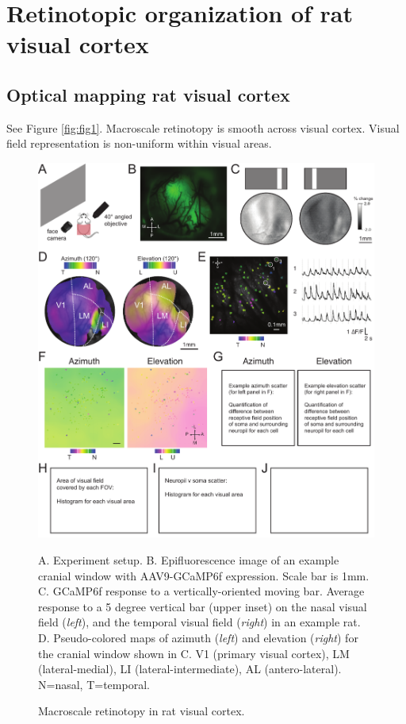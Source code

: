 \documentclass{article}
\begin{document}
\section{Retinotopic organization of rat visual cortex}
\label{sec:retinotopy}

\subsection{Optical mapping rat visual cortex}
See Figure \ref{fig:fig1}. Macroscale retinotopy is smooth across visual cortex. Visual field representation is non-uniform within visual areas. 

\begin{figure}[ht]
  \includegraphics[width=\textwidth]{figures/retino.pdf}
  \caption{Macroscale retinotopy in rat visual cortex.}
  \medskip
  \small
  A.  Experiment setup.  
  B.  Epifluorescence image of an example cranial window with AAV9-GCaMP6f expression. Scale bar is 1mm.  
  C.  GCaMP6f response to a vertically-oriented moving bar. Average response to a 5 degree vertical bar (upper inset) on the nasal visual field (\textit{left}), and the temporal visual field (\textit{right}) in an example rat. 
  D.  Pseudo-colored maps of azimuth (\textit{left}) and elevation (\textit{right}) for the cranial window shown in C. V1 (primary visual cortex), LM (lateral-medial), LI (lateral-intermediate), AL (antero-lateral). N=nasal, T=temporal. 

\end{figure}
\end{document}
